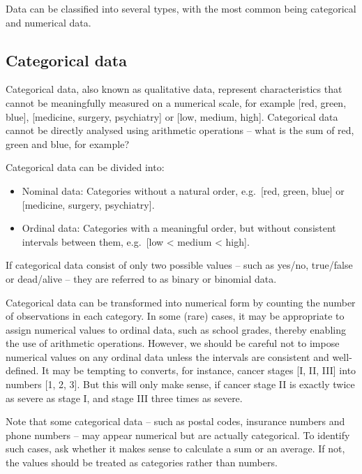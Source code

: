 \documentclass[
]{book}
\begin{document}
Data can be classified into several types, with the most common being categorical and numerical data.

\subsection{Categorical data}\label{categorical-data}

Categorical data, also known as qualitative data, represent characteristics that cannot be meaningfully measured on a numerical scale, for example {[}red, green, blue{]}, {[}medicine, surgery, psychiatry{]} or {[}low, medium, high{]}. Categorical data cannot be directly analysed using arithmetic operations -- what is the sum of red, green and blue, for example?

Categorical data can be divided into:

\begin{itemize}
\item
  Nominal data: Categories without a natural order, e.g.~{[}red, green, blue{]} or {[}medicine, surgery, psychiatry{]}.
\item
  Ordinal data: Categories with a meaningful order, but without consistent intervals between them, e.g.~{[}low \textless{} medium \textless{} high{]}.
\end{itemize}

If categorical data consist of only two possible values -- such as yes/no, true/false or dead/alive -- they are referred to as binary or binomial data.

Categorical data can be transformed into numerical form by counting the number of observations in each category. In some (rare) cases, it may be appropriate to assign numerical values to ordinal data, such as school grades, thereby enabling the use of arithmetic operations. However, we should be careful not to impose numerical values on any ordinal data unless the intervals are consistent and well-defined. It may be tempting to converts, for instance, cancer stages {[}I, II, III{]} into numbers {[}1, 2, 3{]}. But this will only make sense, if cancer stage II is exactly twice as severe as stage I, and stage III three times as severe.

Note that some categorical data -- such as postal codes, insurance numbers and phone numbers -- may appear numerical but are actually categorical. To identify such cases, ask whether it makes sense to calculate a sum or an average. If not, the values should be treated as categories rather than numbers.
\end{document}
